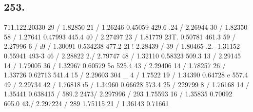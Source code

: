\documentclass[12pt,a4paper]{article}
\begin{document}
\subsection*{253.}
711.122.20330 29 / 1.82850 21 / 1.26246 0.45059 429.6 .24 / 2.26944 30 / 1.82350 58 / 1.27641
0.47993 445.4 40 / 2.27497 23 / 1.81779 23T. 0.50781 461.3 59 / 2.27996 6 /  \i{}9 / 1.30091 0.534238
477.2 2I ! 2.28439 / 39 / 1.80465 .2. -1,31152 0.55941 493-3 46 / 2.28822 2./ 2.79747 48 / 1.32110
0.58323 509.3 13 / 2.29145 14 / 1.79005 36 / 1.32967 0.60579 5o 525.4 43 / 2.29406 14 / 1.78257 26 /
1.33726 0.62713 541.4 15 / 2.29603 304 \_ 4 / 1.7522 19 / 1.34390 0.64728 e 557.4 49 / 2.29734 42 /
1.76818 \i{}5 / 1.34960 0.66628 573.4 25 / 229799 8 / 1.76168 14 / 1.35441 0.638415 / 589.2 2473/
2.297996 / 293 1.75593 16 / 1.35835 0.70092 605.0 43./ 2.297224 / 289 1.75115 21 / 1.36143 0.71661



\newpage
\end{document}

